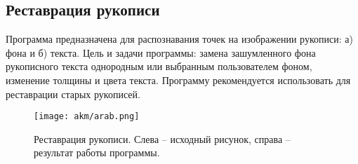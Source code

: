 \subsection{Реставрация рукописи}

Программа предназначена для распознавания точек на изображении рукописи: а) фона и б) текста. Цель и задачи программы: замена зашумленного фона рукописного текста однородным или выбранным пользователем фоном, изменение толщины и цвета текста.
Программу рекомендуется использовать для реставрации старых рукописей.

\begin{figure}[h]
    \begin{center}
        \texttt{[image: akm/arab.png]}
    \end{center}
    \caption*{Реставрация рукописи. Слева -- исходный рисунок, справа -- результат работы программы.}
\end{figure}


%
